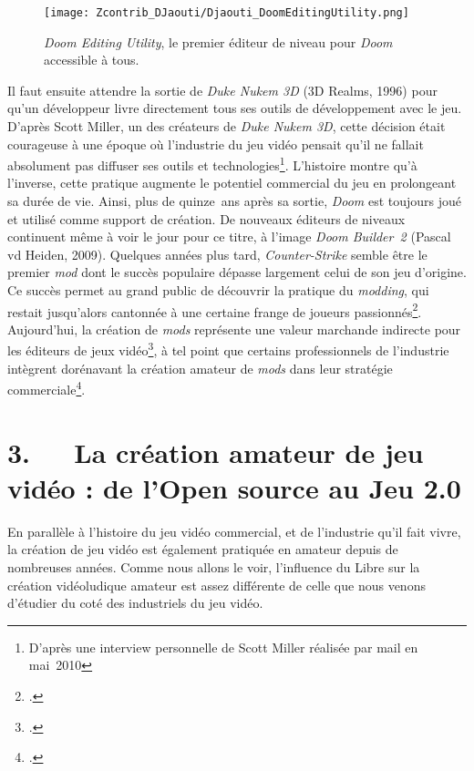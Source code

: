 \documentclass{FramateX}
\begin{document}
\begin{refsection}
\begin{figure}
\centering
\texttt{[image: Zcontrib\_DJaouti/Djaouti\_DoomEditingUtility.png]}
\caption{\textit{Doom Editing Utility}, le premier éditeur de niveau pour  \textit{Doom} accessible à tous.} 
\end{figure}

Il faut ensuite attendre la sortie de \textit{Duke Nukem 3D} (3D Realms, 1996) pour
qu'un développeur livre directement tous ses outils de développement
avec le jeu. D'après Scott Miller, un des créateurs de
\textit{Duke Nukem 3D}, cette décision était
courageuse à une époque où l'industrie du jeu vidéo pensait qu'il ne
fallait absolument pas diffuser ses outils et
technologies\footnote{D'après une interview personnelle de Scott
Miller réalisée par mail en mai~2010}. L'histoire montre qu'à
l'inverse, cette pratique augmente le potentiel commercial du jeu en
prolongeant sa durée de vie. Ainsi, plus de quinze~ans après sa sortie,
\textit{Doom} est toujours joué et utilisé
comme support de création. De nouveaux éditeurs de niveaux continuent
même à voir le jour pour ce titre, à l'image
\textit{Doom Builder~2} (Pascal vd Heiden,
2009). Quelques années plus tard,
\textit{Counter-Strike} semble être le
premier \textit{mod} dont le succès populaire
dépasse largement celui de son jeu d'origine. Ce succès permet au grand
public de découvrir la pratique du
\textit{modding}, qui restait jusqu'alors
cantonnée à une certaine frange de joueurs passionnés\footnote{\cite{laukkanenmodding2005}.}. Aujourd'hui, la création de
\textit{mods} représente une valeur marchande
indirecte pour les éditeurs de jeux vidéo\footnote{\cite{postigomods2007}.}, à tel point
que certains professionnels de l'industrie intègrent dorénavant la
création amateur de \textit{mods} dans leur
stratégie commerciale\footnote{\cite{nieborgmod2008}.}.

\section*{3.~~~La création amateur de jeu vidéo : de l'Open source au Jeu 2.0}
{}


En parallèle à l'histoire du jeu vidéo commercial, et de l'industrie
qu'il fait vivre, la création de jeu vidéo est également pratiquée en
amateur depuis de nombreuses années. Comme nous allons le voir,
l'influence du Libre sur la création vidéoludique amateur est assez
différente de celle que nous venons d'étudier du coté des industriels
du jeu vidéo. 


\end{refsection}
\end{document}

